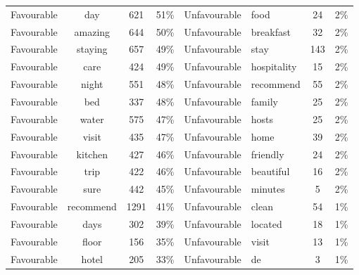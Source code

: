 \documentclass[a4paper, 12pt]{article}
\begin{document}
\begin{table}[htbp]
\begin{tabular}{ccccp{5.715em}p{4.715em}cc}
    \multicolumn{1}{p{4.715em}}{Favourable} & \multicolumn{1}{p{4.715em}}{day} & 621   & 51\%  & Unfavourable & food  & 24    & 2\% \\
    \multicolumn{1}{p{4.715em}}{Favourable} & \multicolumn{1}{p{4.715em}}{amazing} & 644   & 50\%  & Unfavourable & breakfast & 32    & 2\% \\
    \multicolumn{1}{p{4.715em}}{Favourable} & \multicolumn{1}{p{4.715em}}{staying} & 657   & 49\%  & Unfavourable & stay  & 143   & 2\% \\
    \multicolumn{1}{p{4.715em}}{Favourable} & \multicolumn{1}{p{4.715em}}{care} & 424   & 49\%  & Unfavourable & hospitality & 15    & 2\% \\
    \multicolumn{1}{p{4.715em}}{Favourable} & \multicolumn{1}{p{4.715em}}{night} & 551   & 48\%  & Unfavourable & recommend & 55    & 2\% \\
    \multicolumn{1}{p{4.715em}}{Favourable} & \multicolumn{1}{p{4.715em}}{bed} & 337   & 48\%  & Unfavourable & family & 25    & 2\% \\
    \multicolumn{1}{p{4.715em}}{Favourable} & \multicolumn{1}{p{4.715em}}{water} & 575   & 47\%  & Unfavourable & hosts & 25    & 2\% \\
    \multicolumn{1}{p{4.715em}}{Favourable} & \multicolumn{1}{p{4.715em}}{visit} & 435   & 47\%  & Unfavourable & home  & 39    & 2\% \\
    \multicolumn{1}{p{4.715em}}{Favourable} & \multicolumn{1}{p{4.715em}}{kitchen} & 427   & 46\%  & Unfavourable & friendly & 24    & 2\% \\
    \multicolumn{1}{p{4.715em}}{Favourable} & \multicolumn{1}{p{4.715em}}{trip} & 422   & 46\%  & Unfavourable & beautiful & 16    & 2\% \\
    \multicolumn{1}{p{4.715em}}{Favourable} & \multicolumn{1}{p{4.715em}}{sure} & 442   & 45\%  & Unfavourable & minutes & 5     & 2\% \\
    \multicolumn{1}{p{4.715em}}{Favourable} & \multicolumn{1}{p{4.715em}}{recommend} & 1291  & 41\%  & Unfavourable & clean & 54    & 1\% \\
    \multicolumn{1}{p{4.715em}}{Favourable} & \multicolumn{1}{p{4.715em}}{days} & 302   & 39\%  & Unfavourable & located & 18    & 1\% \\
    \multicolumn{1}{p{4.715em}}{Favourable} & \multicolumn{1}{p{4.715em}}{floor} & 156   & 35\%  & Unfavourable & visit & 13    & 1\% \\
    \multicolumn{1}{p{4.715em}}{Favourable} & \multicolumn{1}{p{4.715em}}{hotel} & 205   & 33\%  & Unfavourable & de    & 3     & 1\% \\

\end{tabular}
\end{table}
\end{document}
